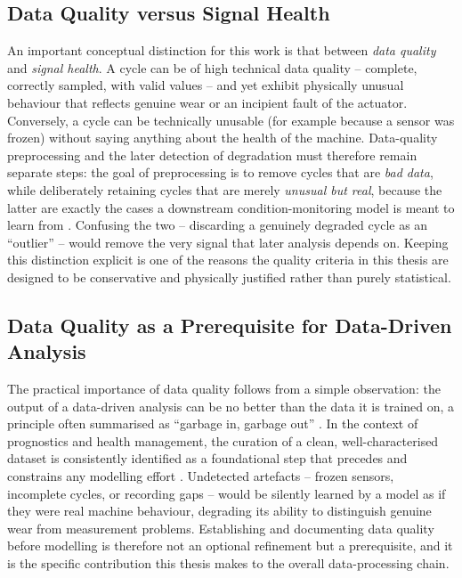 \subsection{Data Quality versus Signal Health}
\label{subsec:Grundlagen_DQ_Gesundheit}

An important conceptual distinction for this work is that between \emph{data quality} and
\emph{signal health}. A cycle can be of high technical data quality -- complete, correctly
sampled, with valid values -- and yet exhibit physically unusual behaviour that reflects
genuine wear or an incipient fault of the actuator. Conversely, a cycle can be technically
unusable (for example because a sensor was frozen) without saying anything about the health
of the machine. Data-quality preprocessing and the later detection of degradation must
therefore remain separate steps: the goal of preprocessing is to remove cycles that are
\emph{bad data}, while deliberately retaining cycles that are merely \emph{unusual but
real}, because the latter are exactly the cases a downstream condition-monitoring model is
meant to learn from \parencite{TODO-condition-monitoring}. Confusing the two -- discarding
a genuinely degraded cycle as an ``outlier'' -- would remove the very signal that later
analysis depends on. Keeping this distinction explicit is one of the reasons the quality
criteria in this thesis are designed to be conservative and physically justified rather
than purely statistical.

\subsection{Data Quality as a Prerequisite for Data-Driven Analysis}
\label{subsec:Grundlagen_DQ_Voraussetzung}

The practical importance of data quality follows from a simple observation: the output of a
data-driven analysis can be no better than the data it is trained on, a principle often
summarised as ``garbage in, garbage out'' \parencite{TODO-data-quality}. In the context of
prognostics and health management, the curation of a clean, well-characterised dataset is
consistently identified as a foundational step that precedes and constrains any modelling
effort \parencite{TODO-phm}. Undetected artefacts -- frozen sensors, incomplete cycles, or
recording gaps -- would be silently learned by a model as if they were real machine
behaviour, degrading its ability to distinguish genuine wear from measurement problems.
Establishing and documenting data quality before modelling is therefore not an optional
refinement but a prerequisite, and it is the specific contribution this thesis makes to the
overall data-processing chain.

